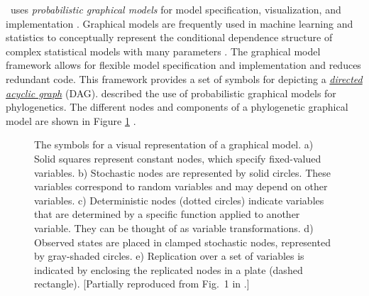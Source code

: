 \RevBayes~uses \textit{probabilistic graphical models} for model specification, visualization, and implementation \citep{Hohna2014b}. 
Graphical models are frequently used in machine learning and statistics to conceptually represent the conditional dependence structure of complex statistical models with many parameters \citep{Gilks1994,Lunn2000,Jordan2004,Koller2009,Lunn2009}. 
The graphical model framework allows for flexible model specification and implementation and reduces redundant code. 
This framework provides a set of symbols for depicting a \href{http://en.wikipedia.org/wiki/Directed_acyclic_graph}{\textit{directed acyclic graph}} (DAG). 
\citet{Hohna2014b} described the use of probabilistic graphical models for phylogenetics. 
The different nodes and components of a phylogenetic graphical model are shown in Figure \ref{gmnotation} \citep[Fig. 1 from][]{Hohna2014b}. 
\begin{figure}[h!]
\centering
{}
\caption{\small The symbols for a visual representation of a graphical model. 
a) Solid squares represent constant nodes, which specify fixed-valued variables. 
b) Stochastic nodes are represented by solid circles. 
These variables correspond to random variables and may depend on other variables. 
c) Deterministic nodes (dotted circles) indicate variables that are determined by a specific function applied to another variable. 
They can be thought of as variable transformations. 
d) Observed states are placed in clamped stochastic nodes, represented by gray-shaded circles. e) Replication over a set of variables is indicated by enclosing the replicated nodes in a plate (dashed rectangle). 
[Partially reproduced from Fig.~1 in \citet{Hohna2014b}.]
}
\label{gmnotation}
\end{figure}

